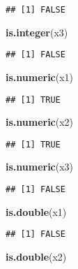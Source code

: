 \documentclass[]{article}
\newenvironment{Shaded}{\begin{snugshade}}{\end{snugshade}}
\newcommand{\KeywordTok}[1]{\textcolor[rgb]{0.13,0.29,0.53}{\textbf{#1}}}
\newcommand{\NormalTok}[1]{#1}
\begin{document}
\begin{verbatim}
## [1] FALSE
\end{verbatim}

\begin{Shaded}
\begin{Highlighting}[]
\KeywordTok{is.integer}\NormalTok{(x3)}
\end{Highlighting}
\end{Shaded}

\begin{verbatim}
## [1] FALSE
\end{verbatim}

\begin{Shaded}
\begin{Highlighting}[]
\KeywordTok{is.numeric}\NormalTok{(x1)}
\end{Highlighting}
\end{Shaded}

\begin{verbatim}
## [1] TRUE
\end{verbatim}

\begin{Shaded}
\begin{Highlighting}[]
\KeywordTok{is.numeric}\NormalTok{(x2)}
\end{Highlighting}
\end{Shaded}

\begin{verbatim}
## [1] TRUE
\end{verbatim}

\begin{Shaded}
\begin{Highlighting}[]
\KeywordTok{is.numeric}\NormalTok{(x3)}
\end{Highlighting}
\end{Shaded}

\begin{verbatim}
## [1] FALSE
\end{verbatim}

\begin{Shaded}
\begin{Highlighting}[]
\KeywordTok{is.double}\NormalTok{(x1) }
\end{Highlighting}
\end{Shaded}

\begin{verbatim}
## [1] FALSE
\end{verbatim}

\begin{Shaded}
\begin{Highlighting}[]
\KeywordTok{is.double}\NormalTok{(x2) }
\end{Highlighting}
\end{Shaded}
\end{document}
